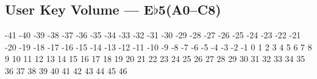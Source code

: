 \subsection[User Key Volume]{User Key Volume --- \UiKey{\I}\UiKey{\SET}E$\flat$5(A0--C8)}
-41
-40
-39
-38
-37
-36
-35
-34
-33
-32
-31
-30
-29
-28
-27
-26
-25
-24
-23
-22
-21
-20
-19
-18
-17
-16
-15
-14
-13
-12
-11
-10
-9
-8
-7
-6
-5
-4
-3
-2
-1
0
1
2
3
4
5
6
7
8
9
10
11
12
13
14
15
16
17
18
19
20
21
22
23
24
25
26
27
28
29
30
31
32
33
34
35
36
37
38
39
40
41
42
43
44
45
46

